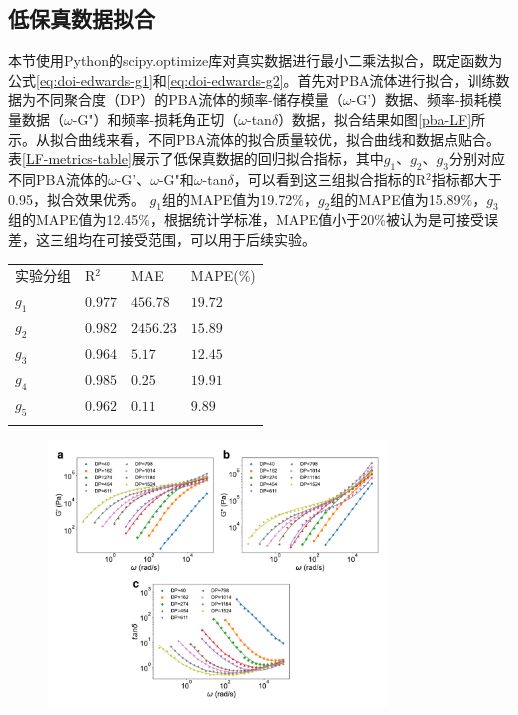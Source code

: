 \subsection{低保真数据拟合}
本节使用Python的scipy.optimize库对真实数据进行最小二乘法拟合，既定函数为公式\eqref{eq:doi-edwards-g1}和\eqref{eq:doi-edwards-g2}。首先对PBA流体进行拟合，训练数据为不同聚合度（DP）的PBA流体的频率-储存模量（$\omega$-G'）数据、频率-损耗模量数据（$\omega$-G"）和频率-损耗角正切（$\omega$-tan$\delta$）数据，拟合结果如图\ref{pba-LF}所示。从拟合曲线来看，不同PBA流体的拟合质量较优，拟合曲线和数据点贴合。表\ref{LF-metrics-table}展示了低保真数据的回归拟合指标，其中$g_1$、$g_2$、$g_3$分别对应不同PBA流体的$\omega$-G'、$\omega$-G"和$\omega$-tan$\delta$，可以看到这三组拟合指标的R$^2$指标都大于0.95，拟合效果优秀。
$g_1$组的MAPE值为19.72\%，$g_2$组的MAPE值为15.89\%，$g_3$组的MAPE值为12.45\%，根据统计学标准，MAPE值小于20\%被认为是可接受误差，这三组均在可接受范围，可以用于后续实验。
\begin{table}
  \centering
  \small
  \begin{tabularx}{\textwidth}{>{\centering\arraybackslash}X >{\centering\arraybackslash}X >{\centering\arraybackslash}X >{\centering\arraybackslash}X} %
    \Xhline{1.5pt}
    实验分组  & R$^2$   & MAE       & MAPE(\%)                \tabularnewline
    \Xhline{0.5pt}  %
    $g_1$ & $0.977$ & $456.78$  & $19.72$ \tabularnewline
    $g_2$ & $0.982$ & $2456.23$ & $15.89 $ \tabularnewline
    $g_3$ & $0.964$ & $5.17$    & $12.45$ \tabularnewline
    $g_4$ & $0.985$ & $0.25$    & $19.91$\tabularnewline
    $g_5$ & $0.962$ & $0.11$    & $9.89$\tabularnewline
    \Xhline{1.5pt}
  \end{tabularx}
\end{table}
\begin{figure}[htbp]
  \centering
  \includegraphics[width=0.8\textwidth]{Fig/pba-LF.pdf}
\end{figure}

